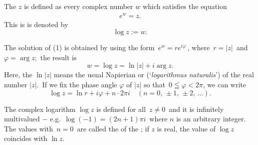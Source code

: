 \documentclass[12pt]{article}
\begin{document}
The  $z$ is defined as every complex number $w$ which satisfies the equation
\begin{align}
                              e^w = z.
\end{align}
This is is denoted by 
                      $$\log{z} := w.$$

The solution of (1) is obtained by using the form \,$e^w = re^{i\varphi}$\,, where\, $r = |z|$\, and \,$\varphi = \arg{z}$;\, the result is
            $$w = \log{z} = \ln{|z|}+i\arg{z}.$$
Here, the $\ln|z|$ means the usual Napierian or  (`{\em logarithmus naturalis}') of the real number $|z|$.\, If we fix the phase angle $\varphi$ of $|z|$ so that \,$0 \leqq \varphi < 2\pi$, we can write
    $$\log{z} = \ln{r}+i\varphi+n\cdot 2\pi i\quad(n = 0,\,\pm1,\,\pm2,\,...).$$

The complex logarithm $\log{z}$ is defined for all \,$z \neq 0$\, and it is infinitely multivalued $-$ e.g.\, $\log{(-1)} = (2n+1)\pi i$\, where $n$ is an arbitrary integer.\, The values with\, $n = 0$\, are called the  of the ; if $z$ is real, the  value of $\log{z}$ coincides with $\ln{z}$.
\end{document}
